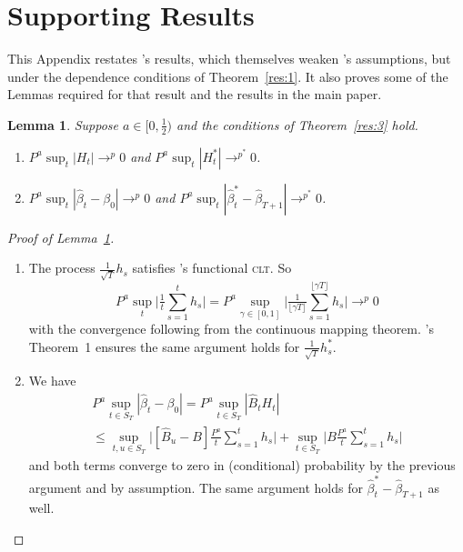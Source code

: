 \documentclass[11pt,fleqn]{article}
\newcommand\citepos[2][]{\citeauthor{#2}'s \citeyearpar[#1]{#2}}
\newtheorem{lema}{Lemma}[section]
\theoremstyle{definition}
\newcommand{\clt}{\textsc{clt}}
\begin{document}
\appendix
\section{Supporting Results}
This Appendix restates \citepos{Mcc:00} results, which themselves
weaken \citepos{Wes:96} assumptions, but under the dependence
conditions of Theorem~\ref{res:1}.  It also proves some of the Lemmas
required for that result and the results in the main paper.

\begin{lema}\label{res:a2}
  Suppose $a \in [0,\frac12)$ and the conditions of Theorem~\ref{res:3}
  hold.
  \begin{enumerate}
  \item $P^a \sup_t | H_{t} | \to^p 0$ and $P^a \sup_t | H_{t}^{*} |
    \to^{p^{*}} 0$.
  \item $P^a \sup_t | \hat{\beta}_{t} - \beta_{0} | \to^{p} 0$ and
    $P^a \sup_t | \hat{\beta}^{*}_{t} - \hat{\beta}_{T+1} |
    \to^{p^{*}} 0$.
  \end{enumerate}
\end{lema}

\begin{proof}[Proof of Lemma~\ref{res:a2}] \quad
  \begin{enumerate}
  \item The process $\tfrac{1}{\sqrt{T}} h_{s}$ satisfies \citepos[Theorem
    3.1]{JoD:00b} functional \clt.  So
    \begin{equation}
      P^a \sup_t \Big| \tfrac1t \sum_{s=1}^t h_{s} \Big| =
      P^a \sup_{\gamma \in [0,1]} \Big| \tfrac{1}{\lfloor \gamma
        T\rfloor} \sum_{s=1}^{\lfloor \gamma T \rfloor} h_{s} \Big| \to^{p} 0
    \end{equation}
    with the convergence following from the continuous mapping
    theorem.  \citepos{Cal:11d} Theorem~1 ensures the same argument
    holds for $\tfrac{1}{\sqrt{T}} h_s^{*}$.
  \item We have
    \begin{multline}
      P^a \sup_{t \in S_T} | \hat{\beta}_t - \beta_0 | = P^a \sup_{t
        \in S_T} |\hat{B}_{t} H_{t}| \\ \leq \sup_{t,u \in S_T} \Big|
      [ \hat{B}_u - B] \tfrac{P^a}{t} \sum_{s=1}^t h_{s} \Big| + \sup_{t\in S_T} \Big|
      B \tfrac{P^a}{t} \sum_{s=1}^t h_{s} \Big|
    \end{multline}
    and both terms converge to zero in (conditional) probability by
    the previous argument and by assumption.  The same argument holds
    for $\hat{\beta}_t^{*} - \hat{\beta}_{T+1}$ as well.
  \end{enumerate}
\end{proof}
\end{document}
